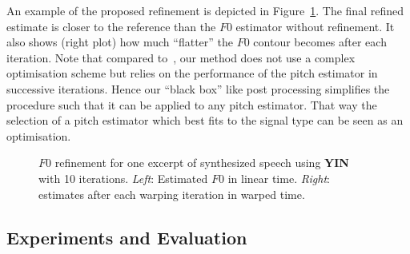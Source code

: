 An example of the proposed refinement is depicted in Figure~\ref{fig:teaser}. The final refined estimate is closer to the reference than the $F0$ estimator without refinement. It also shows (right plot) how much ``flatter'' the $F0$ contour becomes after each iteration.
Note that compared to~\cite{resch}, our method does not use a complex optimisation scheme but relies on the performance of the pitch estimator in successive iterations. Hence our ``black box'' like post processing simplifies the procedure such that it can be applied to any pitch estimator. That way the selection of a pitch estimator which best fits to the signal type can be seen as an optimisation.

\begin{figure}[t]
\centering
{}
\caption{$F0$ refinement for one excerpt of synthesized speech using \textbf{YIN}~\cite{de2002yin} with 10 iterations. \emph{Left}: Estimated $F0$ in linear time. \emph{Right}: estimates after each warping iteration in warped time.}
\label{fig:teaser}
\end{figure}

\vspace{-0.6em}
\subsection{Experiments and Evaluation} %
\label{sec:experiments}

